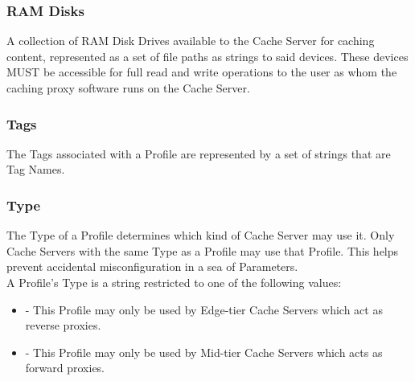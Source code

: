 \subsubsection{RAM Disks}
A collection of RAM Disk Drives available to the Cache Server for caching
content, represented as a set of file paths as strings to said devices. These
devices MUST be accessible for full read and write operations to the user as
whom the caching proxy software runs on the Cache Server.

\subsubsection{Tags}
The Tags associated with a Profile are represented by a set of strings that are
Tag Names.

\subsubsection{Type\label{sec:profile:type}}
The Type of a Profile determines which kind of Cache Server may use it. Only
Cache Servers with the same Type as a Profile may use that Profile. This helps
prevent accidental misconfiguration in a sea of Parameters.\\
A Profile's Type is a string restricted to one of the following values:

\begin{itemize}
	\item {} - This Profile may only be used by Edge-tier Cache
		Servers which act as reverse proxies.
	\item {} - This Profile may only be used by Mid-tier Cache Servers
		which acts as forward proxies.
\end{itemize}
